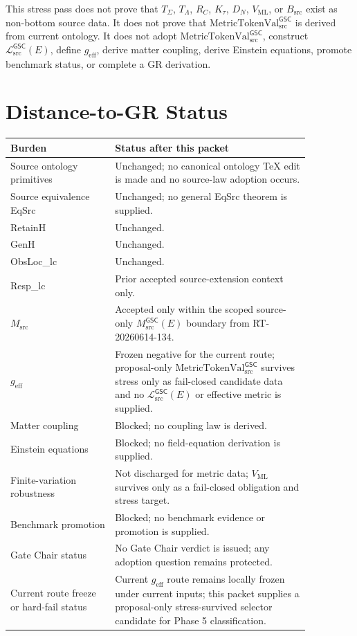 \documentclass[11pt]{article}
\newcommand{\MetricTokenVal}{\mathrm{MetricTokenVal}_{\mathrm{src}}^{\mathsf{GSC}}}
\newcommand{\MetricData}{\mathcal{L}_{\mathrm{src}}^{\mathsf{GSC}}}
\newcommand{\geff}{g_{\mathrm{eff}}}
\begin{document}
This stress pass does not prove that \(T_{\Sigma}\), \(T_{\Lambda}\), \(R_C\),
\(K_{\tau}\), \(D_N\), \(V_{\mathrm{ML}}\), or \(B_{\mathrm{src}}\) exist as
non-bottom source data. It does not prove that \(\MetricTokenVal\) is derived
from current ontology. It does not adopt \(\MetricTokenVal\), construct
\(\MetricData(E)\), define \(\geff\), derive matter coupling, derive Einstein
equations, promote benchmark status, or complete a GR derivation.

\section{Distance-to-GR Status}

\begin{longtable}{p{0.30\linewidth}p{0.56\linewidth}}
\toprule
Burden & Status after this packet \\
\midrule
Source ontology primitives & Unchanged; no canonical ontology TeX edit is made and no source-law adoption occurs. \\
Source equivalence EqSrc & Unchanged; no general EqSrc theorem is supplied. \\
RetainH & Unchanged. \\
GenH & Unchanged. \\
ObsLoc\_lc & Unchanged. \\
Resp\_lc & Prior accepted source-extension context only. \\
\(M_{\mathrm{src}}\) & Accepted only within the scoped source-only \(M_{\mathrm{src}}^{\mathsf{GSC}}(E)\) boundary from RT-20260614-134. \\
\(\geff\) & Frozen negative for the current route; proposal-only \(\MetricTokenVal\) survives stress only as fail-closed candidate data and no \(\MetricData(E)\) or effective metric is supplied. \\
Matter coupling & Blocked; no coupling law is derived. \\
Einstein equations & Blocked; no field-equation derivation is supplied. \\
Finite-variation robustness & Not discharged for metric data; \(V_{\mathrm{ML}}\) survives only as a fail-closed obligation and stress target. \\
Benchmark promotion & Blocked; no benchmark evidence or promotion is supplied. \\
Gate Chair status & No Gate Chair verdict is issued; any adoption question remains protected. \\
Current route freeze or hard-fail status & Current \(g_{\mathrm{eff}}\) route remains locally frozen under current inputs; this packet supplies a proposal-only stress-survived selector candidate for Phase 5 classification. \\
\bottomrule
\end{longtable}
\end{document}
